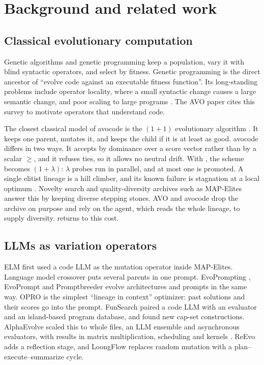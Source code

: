 \section{Background and related work}
\label{sec:background}

\subsection{Classical evolutionary computation}

Genetic algorithms \citep{holland1992adaptation} and genetic programming \citep{koza1992gp} keep a
population, vary it with blind syntactic operators, and select by fitness. Genetic programming is
the direct ancestor of ``evolve code against an executable fitness function''. Its long-standing
problems include operator locality, where a small syntactic change causes a large semantic change,
and poor scaling to large programs \citep{oneill2010openissues}. The AVO paper cites this survey to
motivate operators that understand code.

The closest classical model of avocode is the $(1+1)$ evolutionary algorithm
\citep{back1997handbook,droste2002oneplusone}. It keeps one parent, mutates it, and keeps the child
if it is at least as good. avocode differs in two ways. It accepts by dominance over a score vector
rather than by a scalar $\geq$, and it refuses ties, so it allows no neutral drift. With ,
the scheme becomes $(1+\lambda)$: $\lambda$ probes run in parallel, and at most one is promoted. A
single elitist lineage is a hill climber, and its known failure is stagnation at a local optimum
\citep{russell2020aima}. Novelty search \citep{lehman2011novelty} and quality-diversity archives
such as MAP-Elites \citep{mouret2015mapelites} answer this by keeping diverse stepping stones.
AVO and avocode drop the archive on purpose and rely on the agent, which reads the whole lineage,
to supply diversity.  returns to this cost.

\subsection{LLMs as variation operators}

ELM \citep{lehman2022elm} first used a code LLM as the mutation operator inside MAP-Elites.
Language model crossover \citep{meyerson2024lmx} puts several parents in one prompt. EvoPrompting
\citep{chen2023evoprompting}, EvoPrompt \citep{guo2023evoprompt} and Promptbreeder
\citep{fernando2023promptbreeder} evolve architectures and prompts in the same way. OPRO
\citep{yang2024opro} is the simplest ``lineage in context'' optimizer: past solutions and their
scores go into the prompt. FunSearch \citep{romeraparedes2024funsearch} paired a code LLM with an
evaluator and an island-based program database, and found new cap-set constructions. AlphaEvolve
\citep{novikov2025alphaevolve} scaled this to whole files, an LLM ensemble and asynchronous
evaluators, with results in matrix multiplication, scheduling and kernels
\citep{georgiev2025mathexploration}. ReEvo \citep{ye2024reevo} adds a reflection stage, and
LoongFlow \citep{wan2025loongflow} replaces random mutation with a plan--execute--summarize cycle.

